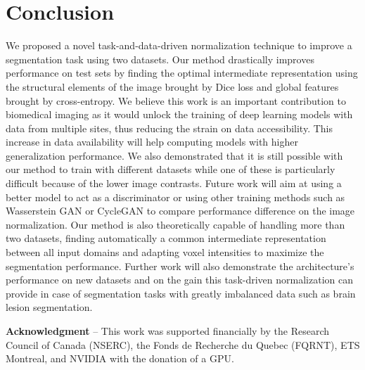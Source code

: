\documentclass{article}
\begin{document}
\section{Conclusion}

We proposed a novel task-and-data-driven normalization technique to improve a segmentation task using two datasets. Our method drastically improves performance on test sets by finding the optimal intermediate representation using the structural elements of the image brought by Dice loss and global features brought by cross-entropy. We believe this work is an important contribution to biomedical imaging as it would unlock the training of deep learning models with data from multiple sites, thus reducing the strain on data accessibility. This increase in data availability will help computing models with higher generalization performance. We also demonstrated that it is still possible with our method to train with different datasets while one of these is particularly difficult because of the lower image contrasts. Future work will aim at using a better model to act as a discriminator or using other training methods such as Wasserstein GAN \cite{Arjovsky2017} or CycleGAN \cite{Zhu2017} to compare performance difference on the image normalization. Our method is also theoretically capable of handling more than two datasets, finding automatically a common intermediate representation between all input domains and adapting voxel intensities to maximize the segmentation performance. Further work will also demonstrate the architecture's performance on new datasets and on the gain this task-driven normalization can provide in case of segmentation tasks with greatly imbalanced data such as brain lesion segmentation.

    \medskip
\noindent
\textbf{Acknowledgment} -- This work was supported financially by the Research Council of Canada (NSERC), the  Fonds  de Recherche du Quebec (FQRNT), ETS Montreal, and NVIDIA with the donation of a GPU.



\end{document}
